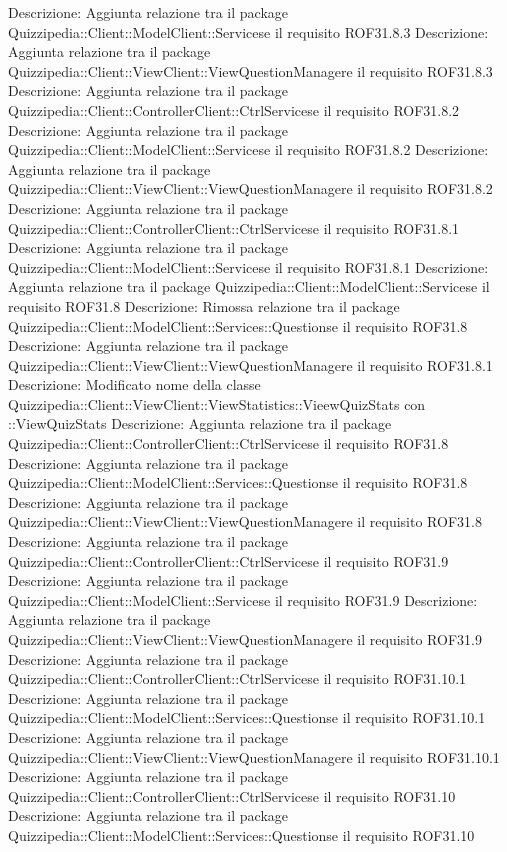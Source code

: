 Descrizione: Aggiunta relazione tra il package Quizzipedia::Client::ModelClient::Servicese il requisito ROF31.8.3 
Descrizione: Aggiunta relazione tra il package Quizzipedia::Client::ViewClient::ViewQuestionManagere il requisito ROF31.8.3 
Descrizione: Aggiunta relazione tra il package Quizzipedia::Client::ControllerClient::CtrlServicese il requisito ROF31.8.2 
Descrizione: Aggiunta relazione tra il package Quizzipedia::Client::ModelClient::Servicese il requisito ROF31.8.2 
Descrizione: Aggiunta relazione tra il package Quizzipedia::Client::ViewClient::ViewQuestionManagere il requisito ROF31.8.2 
Descrizione: Aggiunta relazione tra il package Quizzipedia::Client::ControllerClient::CtrlServicese il requisito ROF31.8.1 
Descrizione: Aggiunta relazione tra il package Quizzipedia::Client::ModelClient::Servicese il requisito ROF31.8.1 
Descrizione: Aggiunta relazione tra il package Quizzipedia::Client::ModelClient::Servicese il requisito ROF31.8 
Descrizione: Rimossa relazione tra il package Quizzipedia::Client::ModelClient::Services::Questionse il requisito ROF31.8 
Descrizione: Aggiunta relazione tra il package Quizzipedia::Client::ViewClient::ViewQuestionManagere il requisito ROF31.8.1 
Descrizione: Modificato nome della classe Quizzipedia::Client::ViewClient::ViewStatistics::VieewQuizStats con ::ViewQuizStats 
Descrizione: Aggiunta relazione tra il package Quizzipedia::Client::ControllerClient::CtrlServicese il requisito ROF31.8 
Descrizione: Aggiunta relazione tra il package Quizzipedia::Client::ModelClient::Services::Questionse il requisito ROF31.8 
Descrizione: Aggiunta relazione tra il package Quizzipedia::Client::ViewClient::ViewQuestionManagere il requisito ROF31.8 
Descrizione: Aggiunta relazione tra il package Quizzipedia::Client::ControllerClient::CtrlServicese il requisito ROF31.9 
Descrizione: Aggiunta relazione tra il package Quizzipedia::Client::ModelClient::Servicese il requisito ROF31.9 
Descrizione: Aggiunta relazione tra il package Quizzipedia::Client::ViewClient::ViewQuestionManagere il requisito ROF31.9 
Descrizione: Aggiunta relazione tra il package Quizzipedia::Client::ControllerClient::CtrlServicese il requisito ROF31.10.1 
Descrizione: Aggiunta relazione tra il package Quizzipedia::Client::ModelClient::Services::Questionse il requisito ROF31.10.1 
Descrizione: Aggiunta relazione tra il package Quizzipedia::Client::ViewClient::ViewQuestionManagere il requisito ROF31.10.1 
Descrizione: Aggiunta relazione tra il package Quizzipedia::Client::ControllerClient::CtrlServicese il requisito ROF31.10 
Descrizione: Aggiunta relazione tra il package Quizzipedia::Client::ModelClient::Services::Questionse il requisito ROF31.10 
